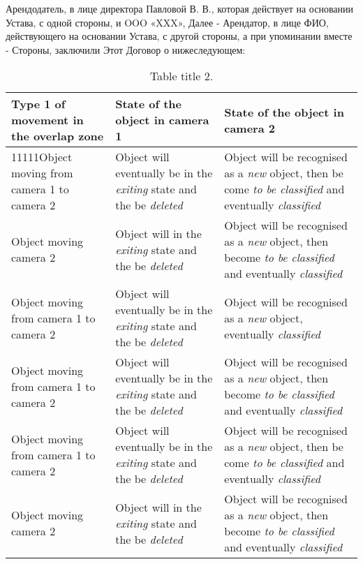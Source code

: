 Арендодатель, в лице директора Павловой В. В., которая действует на
основании Устава, с одной стороны, и OOO «XXX», Далее - Арендатор, в
лице ФИО, действующего на основании Устава, с другой стороны, а при
упоминании вместе - Стороны, заключили Этот Договор о нижеследующем:

{\small \begin{center}
\tabulinesep=2mm
\begin{longtabu} to \textwidth { | X[0.5,c,p] | X[0.5,l,p] | X[1,l,p] | }  %
\hline
\textbf{Type 1 of movement in the overlap zone} & \textbf{State of the object in camera 1} & \textbf{State of the object in camera 2}  \\ \hline
\endfirsthead
\hline
\endfoot
\caption{Table title 2.}
\endlastfoot

11111Object moving from camera 1 to camera 2 & Object will eventually be in the \emph{exiting} state and the be \emph{deleted} & Object will be recognised as a \emph{new} object, then be come \emph{to be classified} and eventually \emph{classified} \\ \hline

Object moving camera 2 & Object will in the \emph{exiting} state and the be \emph{deleted} & Object will be recognised as a \emph{new} object, then become \emph{to be classified} and eventually \emph{classified} \\ \hline

Object moving from camera 1 to camera 2 & Object will eventually be in the \emph{exiting} state and the be \emph{deleted} & Object will be recognised as a \emph{new} object, eventually \emph{classified} \\ \hline

Object moving from camera 1 to camera 2 & Object will eventually be in the \emph{exiting} state and the be \emph{deleted} & Object will be recognised as a \emph{new} object, then become \emph{to be classified} and eventually \emph{classified} \\ \hline

Object moving from camera 1 to camera 2 & Object will eventually be in the \emph{exiting} state and the be \emph{deleted} & Object will be recognised as a \emph{new} object, then be come \emph{to be classified} and eventually \emph{classified} \\ \hline

Object moving camera 2 & Object will in the \emph{exiting} state and the be \emph{deleted} & Object will be recognised as a \emph{new} object, then become \emph{to be classified} and eventually \emph{classified} \\ \hline


\end{longtabu}
\end{center}}
